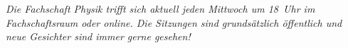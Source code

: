 \begin{multicols*}{2}
\emph{Die Fachschaft Physik trifft sich aktuell jeden Mittwoch um 18~Uhr im Fachschaftsraum oder online.
Die Sitzungen sind grundsätzlich öffentlich und neue Gesichter sind immer gerne gesehen!}




\end{multicols*}


\clearpage


